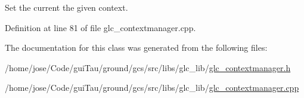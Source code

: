 Set the current the given context. 



Definition at line 81 of file glc\-\_\-contextmanager.\-cpp.



The documentation for this class was generated from the following files\-:\begin{DoxyCompactItemize}
\item 
/home/jose/\-Code/gui\-Tau/ground/gcs/src/libs/glc\-\_\-lib/\hyperlink{glc__contextmanager_8h}{glc\-\_\-contextmanager.\-h}\item 
/home/jose/\-Code/gui\-Tau/ground/gcs/src/libs/glc\-\_\-lib/\hyperlink{glc__contextmanager_8cpp}{glc\-\_\-contextmanager.\-cpp}\end{DoxyCompactItemize}
